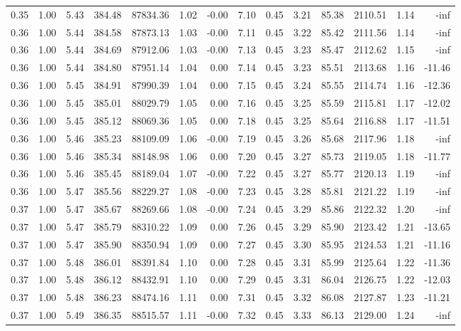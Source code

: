 \begin{table}[!ht]
\begin{tabular}{rrrrrrrrrrrrrr}
0.35 & 1.00 & 5.43 & 384.48 & 87834.36 & 1.02 & -0.00 & 7.10 & 0.45 & 3.21 & 85.38 & 2110.51 & 1.14 & -inf \\
0.36 & 1.00 & 5.44 & 384.58 & 87873.13 & 1.03 & -0.00 & 7.11 & 0.45 & 3.22 & 85.42 & 2111.56 & 1.14 & -inf \\
0.36 & 1.00 & 5.44 & 384.69 & 87912.06 & 1.03 & -0.00 & 7.13 & 0.45 & 3.23 & 85.47 & 2112.62 & 1.15 & -inf \\
0.36 & 1.00 & 5.44 & 384.80 & 87951.14 & 1.04 & 0.00 & 7.14 & 0.45 & 3.23 & 85.51 & 2113.68 & 1.16 & -11.46 \\
0.36 & 1.00 & 5.45 & 384.91 & 87990.39 & 1.04 & 0.00 & 7.15 & 0.45 & 3.24 & 85.55 & 2114.74 & 1.16 & -12.36 \\
0.36 & 1.00 & 5.45 & 385.01 & 88029.79 & 1.05 & 0.00 & 7.16 & 0.45 & 3.25 & 85.59 & 2115.81 & 1.17 & -12.02 \\
0.36 & 1.00 & 5.45 & 385.12 & 88069.36 & 1.05 & 0.00 & 7.18 & 0.45 & 3.25 & 85.64 & 2116.88 & 1.17 & -11.51 \\
0.36 & 1.00 & 5.46 & 385.23 & 88109.09 & 1.06 & -0.00 & 7.19 & 0.45 & 3.26 & 85.68 & 2117.96 & 1.18 & -inf \\
0.36 & 1.00 & 5.46 & 385.34 & 88148.98 & 1.06 & 0.00 & 7.20 & 0.45 & 3.27 & 85.73 & 2119.05 & 1.18 & -11.77 \\
0.36 & 1.00 & 5.46 & 385.45 & 88189.04 & 1.07 & -0.00 & 7.22 & 0.45 & 3.27 & 85.77 & 2120.13 & 1.19 & -inf \\
0.36 & 1.00 & 5.47 & 385.56 & 88229.27 & 1.08 & -0.00 & 7.23 & 0.45 & 3.28 & 85.81 & 2121.22 & 1.19 & -inf \\
0.37 & 1.00 & 5.47 & 385.67 & 88269.66 & 1.08 & -0.00 & 7.24 & 0.45 & 3.29 & 85.86 & 2122.32 & 1.20 & -inf \\
0.37 & 1.00 & 5.47 & 385.79 & 88310.22 & 1.09 & 0.00 & 7.26 & 0.45 & 3.29 & 85.90 & 2123.42 & 1.21 & -13.65 \\
0.37 & 1.00 & 5.47 & 385.90 & 88350.94 & 1.09 & 0.00 & 7.27 & 0.45 & 3.30 & 85.95 & 2124.53 & 1.21 & -11.16 \\
0.37 & 1.00 & 5.48 & 386.01 & 88391.84 & 1.10 & 0.00 & 7.28 & 0.45 & 3.31 & 85.99 & 2125.64 & 1.22 & -11.36 \\
0.37 & 1.00 & 5.48 & 386.12 & 88432.91 & 1.10 & 0.00 & 7.29 & 0.45 & 3.31 & 86.04 & 2126.75 & 1.22 & -12.03 \\
0.37 & 1.00 & 5.48 & 386.23 & 88474.16 & 1.11 & 0.00 & 7.31 & 0.45 & 3.32 & 86.08 & 2127.87 & 1.23 & -11.21 \\
0.37 & 1.00 & 5.49 & 386.35 & 88515.57 & 1.11 & -0.00 & 7.32 & 0.45 & 3.33 & 86.13 & 2129.00 & 1.24 & -inf \\

\end{tabular}
\end{table}
